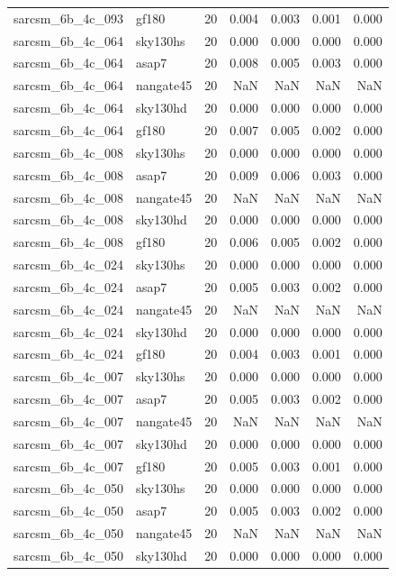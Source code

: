 \begin{tabular}{llrrrrr}
sarcsm\_6b\_4c\_093 & gf180 & 20 & 0.004 & 0.003 & 0.001 & 0.000 \\
sarcsm\_6b\_4c\_064 & sky130hs & 20 & 0.000 & 0.000 & 0.000 & 0.000 \\
sarcsm\_6b\_4c\_064 & asap7 & 20 & 0.008 & 0.005 & 0.003 & 0.000 \\
sarcsm\_6b\_4c\_064 & nangate45 & 20 & NaN & NaN & NaN & NaN \\
sarcsm\_6b\_4c\_064 & sky130hd & 20 & 0.000 & 0.000 & 0.000 & 0.000 \\
sarcsm\_6b\_4c\_064 & gf180 & 20 & 0.007 & 0.005 & 0.002 & 0.000 \\
sarcsm\_6b\_4c\_008 & sky130hs & 20 & 0.000 & 0.000 & 0.000 & 0.000 \\
sarcsm\_6b\_4c\_008 & asap7 & 20 & 0.009 & 0.006 & 0.003 & 0.000 \\
sarcsm\_6b\_4c\_008 & nangate45 & 20 & NaN & NaN & NaN & NaN \\
sarcsm\_6b\_4c\_008 & sky130hd & 20 & 0.000 & 0.000 & 0.000 & 0.000 \\
sarcsm\_6b\_4c\_008 & gf180 & 20 & 0.006 & 0.005 & 0.002 & 0.000 \\
sarcsm\_6b\_4c\_024 & sky130hs & 20 & 0.000 & 0.000 & 0.000 & 0.000 \\
sarcsm\_6b\_4c\_024 & asap7 & 20 & 0.005 & 0.003 & 0.002 & 0.000 \\
sarcsm\_6b\_4c\_024 & nangate45 & 20 & NaN & NaN & NaN & NaN \\
sarcsm\_6b\_4c\_024 & sky130hd & 20 & 0.000 & 0.000 & 0.000 & 0.000 \\
sarcsm\_6b\_4c\_024 & gf180 & 20 & 0.004 & 0.003 & 0.001 & 0.000 \\
sarcsm\_6b\_4c\_007 & sky130hs & 20 & 0.000 & 0.000 & 0.000 & 0.000 \\
sarcsm\_6b\_4c\_007 & asap7 & 20 & 0.005 & 0.003 & 0.002 & 0.000 \\
sarcsm\_6b\_4c\_007 & nangate45 & 20 & NaN & NaN & NaN & NaN \\
sarcsm\_6b\_4c\_007 & sky130hd & 20 & 0.000 & 0.000 & 0.000 & 0.000 \\
sarcsm\_6b\_4c\_007 & gf180 & 20 & 0.005 & 0.003 & 0.001 & 0.000 \\
sarcsm\_6b\_4c\_050 & sky130hs & 20 & 0.000 & 0.000 & 0.000 & 0.000 \\
sarcsm\_6b\_4c\_050 & asap7 & 20 & 0.005 & 0.003 & 0.002 & 0.000 \\
sarcsm\_6b\_4c\_050 & nangate45 & 20 & NaN & NaN & NaN & NaN \\
sarcsm\_6b\_4c\_050 & sky130hd & 20 & 0.000 & 0.000 & 0.000 & 0.000 \\

\end{tabular}
